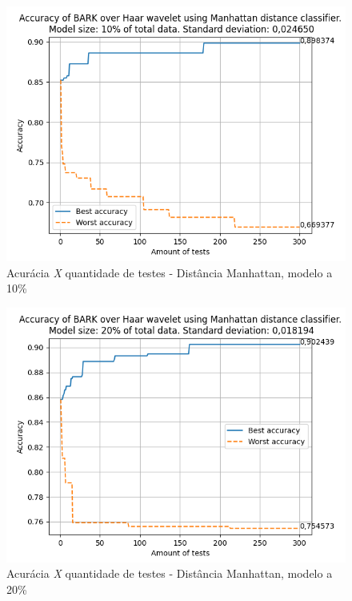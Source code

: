 		\newpage
		\begin{figure}
			\centering
			\includegraphics{images/results/confusionMatrices/classifier_Manhattan_10.png}
			\caption{Acurácia \textit{X} quantidade de testes - Distância Manhattan, modelo a 10\%}
			\label{fig:classifiermanhattan10}
		\end{figure}
		
	
		\newpage
		\begin{figure}
			\centering
			\includegraphics{images/results/confusionMatrices/classifier_Manhattan_20.png}
			\caption{Acurácia \textit{X} quantidade de testes - Distância Manhattan, modelo a 20\%}
			\label{fig:classifiermanhattan20}
		\end{figure}
		
	
